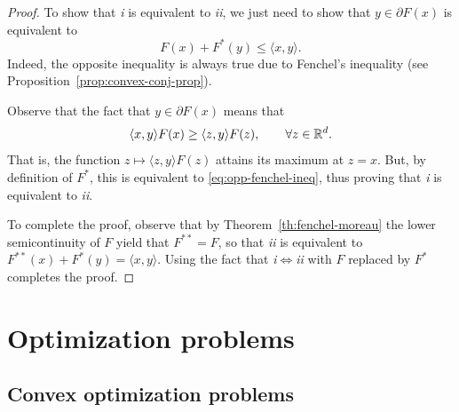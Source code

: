 \documentclass{report}
\begin{document}
\begin{proof}
	To show that \emph{i} is equivalent to \emph{ii}, we just need to show that $y\in \partial F(x)$ is equivalent to 
	\begin{equation}
		\label{eq:opp-fenchel-ineq}
		F(x)+F^*(y) \le \langle  x,y\rangle.
	\end{equation}
	Indeed, the opposite inequality is always true due to Fenchel's inequality (see Proposition~\ref{prop:convex-conj-prop}).

	Observe that the fact that $y\in\partial F(x)$ means that
	\begin{equation}
		\langle x,y\rangle F(x)
		\ge \langle z,y\rangle F(z), \qquad \forall z\in \mathbb{R}^d.
	\end{equation}
	That is, the function $z\mapsto \langle z,y\rangle F(z)$ attains its maximum at $z=x$. But, by definition of $F^*$, this is equivalent to \eqref{eq:opp-fenchel-ineq}, thus proving that \emph{i} is equivalent to \emph{ii}.

	To complete the proof, observe that by Theorem~\ref{th:fenchel-moreau} the lower semicontinuity of $F$ yield that $F^{**}=F$, so that \emph{ii} is equivalent to $F^{**}(x)+F^*(y)=\langle x,y\rangle$. Using the fact that \emph{i}$\iff$\emph{ii} with $F$ replaced by $F^*$ completes the proof.
\end{proof}

\chapter{Optimization problems}

\section{Convex optimization problems}

\end{document}
